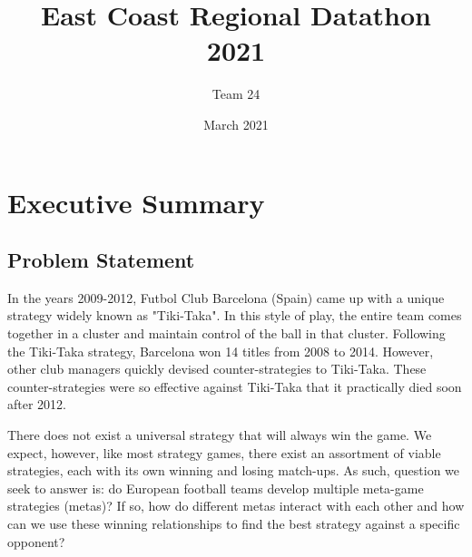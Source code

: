 \documentclass{article}
\title{\textbf{East Coast Regional Datathon 2021}} %
\author{Team 24}
\date{March 2021}
\begin{document}
\maketitle


\section{Executive Summary}
\subsection{Problem Statement}
In the years 2009-2012, Futbol Club Barcelona (Spain) came up with a unique strategy widely known as "Tiki-Taka"\cite{1}. In this style of play, the entire team comes together in a cluster and maintain control of the ball in that cluster\cite{2}. Following the Tiki-Taka strategy, Barcelona won 14 titles from 2008 to 2014. However, other club managers quickly devised counter-strategies to Tiki-Taka. These counter-strategies were so effective against Tiki-Taka that it practically died soon after 2012\cite{3}. 

There does not exist a universal strategy that will always win the game. We expect, however, like most strategy games, there exist an assortment of viable strategies, each with its own winning and losing match-ups. As such, question we seek to answer is: do European football teams develop multiple meta-game strategies (metas)? If so, how do different metas interact with each other and how can we use these winning relationships to find the best strategy against a specific opponent?
\end{document}
